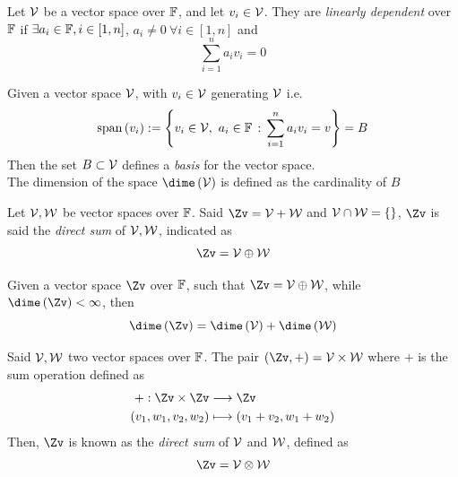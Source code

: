 \documentclass[../complete.tex]{subfiles}
\begin{document}
\begin{dfn}
	Let $\mathcal{V}$ be a vector space over $\mathbb{F}$, and let $v_i\in\mathcal{V}$. They are \textit{linearly dependent} over $\mathbb{F}$ if $\exists a_i\in\mathbb{F}, i\in[1, n]$, $a_i\ne0\ \forall i\in[1, n]$ and
	\begin{equation*}
		\sum_{i=1}^{n}a_iv_i=0
	\end{equation*}
\end{dfn}
\begin{dfn}
	Given a vector space $\mathcal{V}$, with $v_i\in\mathcal{V}$ generating $\mathcal{V}$ i.e.
	\begin{equation*}
		\span\left( v_i \right):=\left\{ v_i\in\V, \ a_i\in\F\st \sum_{i=1}^na_iv_i=v \right\}=B
	\end{equation*}
	Then the set $B\subset\mathcal{V}$ defines a \textit{basis} for the vector space.\\
	The dimension of the space $\dime\left( \V \right)$ is defined as the cardinality of $B$
\end{dfn}
\begin{dfn}
	Let $\mathcal{V}, \mathcal{W}$ be vector spaces over $\mathbb{F}$. Said $\Zv=\V+\W$ and $\mathcal{V}\cap\mathcal{W}=\left\{  \right\}$, $\Zv$ is said the \textit{direct sum} of $\mathcal{V}, \mathcal{W}$, indicated as
	\begin{equation*}
		\Zv=\V\oplus\W
	\end{equation*}
\end{dfn}
\begin{thm}
	Given a vector space $\Zv$ over $\mathbb{F}$, such that $\Zv=\V\oplus\W$, while $\dime\left( \Zv \right)<\infty$, then
	\begin{equation*}
		\dime\left( \Zv \right)=\dime\left( \V \right)+\dime\left( \W \right)
	\end{equation*}
\end{thm}
\begin{dfn}
	Said $\mathcal{V}, \mathcal{W}$ two vector spaces over $\mathbb{F}$. The pair $(\Zv, +)=\V\times\W$ where $+$ is the sum operation defined as
	\begin{equation*}
		\begin{aligned}
			+:\Zv\times\Zv&\fto\Zv\\
			(v_1, w_1, v_2, w_2)&\longmapsto(v_1+v_2, w_1+w_2)
		\end{aligned}
	\end{equation*}
	Then, $\Zv$ is known as the \textit{direct sum} of $\mathcal{V}$ and $\mathcal{W}$, defined as
	\begin{equation*}
		\Zv=\V\otimes\W
	\end{equation*}
\end{dfn}
\end{document}
